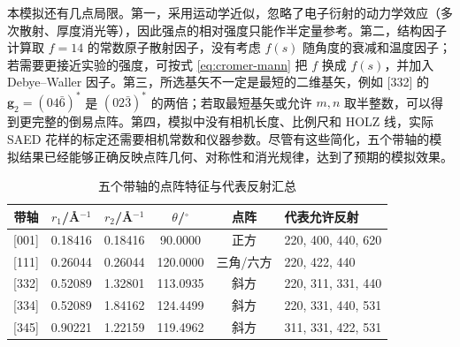 本模拟还有几点局限。第一，采用运动学近似，忽略了电子衍射的动力学效应（多次散射、厚度消光等），因此强点的相对强度只能作半定量参考。第二，结构因子计算取 $f=14$ 的常数原子散射因子，没有考虑 $f(s)$ 随角度的衰减和温度因子；若需要更接近实验的强度，可按式 \eqref{eq:cromer-mann} 把 $f$ 换成 $f(s)$，并加入 Debye--Waller 因子。第三，所选基矢不一定是最短的二维基矢，例如 [332] 的 $\bm{g}_2=(04\bar{6})^*$ 是 $(02\bar{3})^*$ 的两倍；若取最短基矢或允许 $m,n$ 取半整数，可以得到更完整的倒易点阵。第四，模拟中没有相机长度、比例尺和 HOLZ 线，实际 SAED 花样的标定还需要相机常数和仪器参数。尽管有这些简化，五个带轴的模拟结果已经能够正确反映点阵几何、对称性和消光规律，达到了预期的模拟效果。

\begin{table}[H]
  \centering
  \caption{五个带轴的点阵特征与代表反射汇总}
  \label{tab:zone-summary}
  \small
  \setlength{\tabcolsep}{4pt}
  \renewcommand{\arraystretch}{1.08}
  \begin{tabular}{cccccl}
    \toprule
    带轴 & $r_1$/\AA$^{-1}$ & $r_2$/\AA$^{-1}$ & $\theta$/$^\circ$ & 点阵 & 代表允许反射 \\
    \midrule
    {}[001] & 0.18416 & 0.18416 & 90.0000  & 正方 & 220, 400, 440, 620 \\
    {}[111] & 0.26044 & 0.26044 & 120.0000 & 三角/六方 & 220, 422, 440 \\
    {}[332] & 0.52089 & 1.32801 & 113.0935 & 斜方 & 220, 311, 331, 440 \\
    {}[334] & 0.52089 & 1.84162 & 124.4499 & 斜方 & 220, 331, 440, 531 \\
    {}[345] & 0.90221 & 1.22159 & 119.4962 & 斜方 & 311, 331, 422, 531 \\
    \bottomrule
  \end{tabular}
\end{table}
